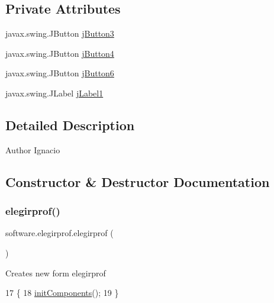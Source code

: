 \subsection*{Private Attributes}
\begin{DoxyCompactItemize}
\item 
javax.\+swing.\+J\+Button \mbox{\hyperlink{classsoftware_1_1elegirprof_af66925a660384d3f86f5cb3459c9acd0}{j\+Button3}}
\item 
javax.\+swing.\+J\+Button \mbox{\hyperlink{classsoftware_1_1elegirprof_a9b56596496adced58249f364ee8944b2}{j\+Button4}}
\item 
javax.\+swing.\+J\+Button \mbox{\hyperlink{classsoftware_1_1elegirprof_a230246a01ebe054fe6b990811ba3c403}{j\+Button6}}
\item 
javax.\+swing.\+J\+Label \mbox{\hyperlink{classsoftware_1_1elegirprof_a922b779cc2161f5cc8f9f4bff21fb1db}{j\+Label1}}
\end{DoxyCompactItemize}


\subsection{Detailed Description}
\begin{DoxyAuthor}{Author}
Ignacio 
\end{DoxyAuthor}


\subsection{Constructor \& Destructor Documentation}
\mbox{\label{classsoftware_1_1elegirprof_aa313615b4f8abecfacd11e7a5a8c41f6}} 
\subsubsection{\texorpdfstring{elegirprof()}{elegirprof()}}
{\footnotesize\ttfamily software.\+elegirprof.\+elegirprof (\begin{DoxyParamCaption}{ }\end{DoxyParamCaption})\hspace{0.3cm}{\ttfamily [inline]}}

Creates new form elegirprof 
\begin{DoxyCode}
17                         \{
18         \mbox{\hyperlink{classsoftware_1_1elegirprof_abc5a84bcdb0181a59f2f9d129cb2829f}{initComponents}}();
19     \}
\end{DoxyCode}


